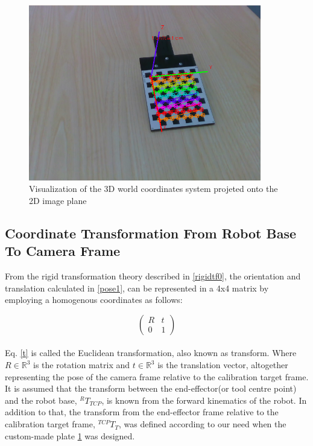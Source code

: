 \begin{figure}[!h]
\begin{center}
\includegraphics[width=4in]{figures03/calibrationtarget1.png}
\caption{Visualization of the 3D world coordinates system projeted onto the 2D image plane}
\label{fig:target3}
\end{center}
\end{figure}



\subsection{Coordinate Transformation From Robot Base To Camera Frame}
From the rigid transformation theory described in \ref{rigidtf0}, the orientation and translation calculated in \ref{pose1}, can be represented in a 4x4 matrix by employing a homogenous coordinates as follows:

\begin{equation}
\begin{pmatrix}
R & t \\ \label{t}
0 & 1
\end{pmatrix}
\end{equation}
\\
Eq. \ref{t} is called the Euclidean transformation, also known as transform. Where $R \in \mathbb{R}^{3}$ is the rotation matrix and $t \in \mathbb{R}^{3}$ is the translation vector, altogether representing the pose of the camera frame relative to the calibration target frame.\\
It is assumed that the transform between the end-effector(or tool centre point) and the robot base, $ ^{R}T_{TCP}$, is known from the forward kinematics of the robot. In addition to that, the transform from the end-effector frame relative to the calibration target frame, $ ^{TCP}T_{T}$, was defined according to our need when the custom-made plate \ref{fig:target3} was designed.


